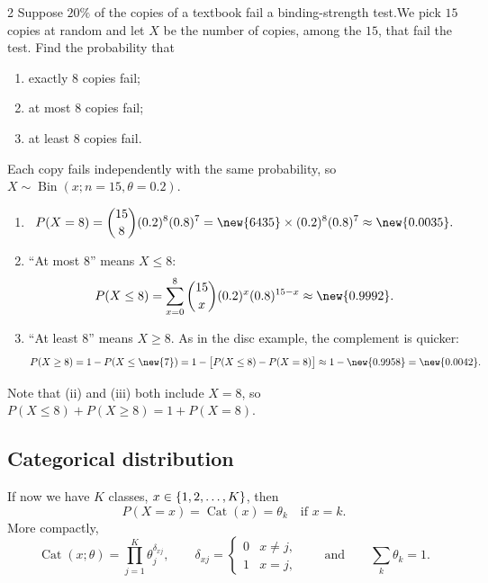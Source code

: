 \begin{homework}{2}
Suppose $20\%$ of the copies of a textbook fail a binding-strength test.\footnotemark We pick $15$ copies at random and let $X$ be the number of copies, among the $15$, that fail the test. Find the probability that
\begin{enumerate}[label=(\roman*)]
\item exactly $8$ copies fail;
\item at most $8$ copies fail;
\item at least $8$ copies fail.
\end{enumerate}

\soln
Each copy fails independently with the same probability, so $X \sim \operatorname{Bin}(x; n = 15, \theta = 0.2)$.
\begin{enumerate}[label=(\roman*)]
\item
\[
P(X = 8) = \binom{15}{8}(0.2)^{8}(0.8)^{7} = \new{6435}\times(0.2)^{8}(0.8)^{7} \approx \new{0.0035}.
\]
\item ``At most $8$'' means $X \le 8$:
\[
P(X \le 8) = \sum_{x=0}^{8}\binom{15}{x}(0.2)^{x}(0.8)^{15-x} \approx \new{0.9992}.
\]
\item ``At least $8$'' means $X \ge 8$. As in the disc example, the complement is quicker:
\[
P(X \ge 8) = 1 - P(X \le \new{7}) = 1 - \big[P(X \le 8) - P(X = 8)\big] \approx 1 - \new{0.9958} = \new{0.0042}.
\]
\end{enumerate}
Note that (ii) and (iii) both include $X = 8$, so $P(X \le 8) + P(X \ge 8) = 1 + P(X = 8)$.
\end{homework}

\subsection{Categorical distribution}
If now we have $K$ classes, $x \in \left\{1, 2, \dots, K\right\}$, then
\[
P(X = x) = \operatorname{Cat}(x) = \theta_k \quad \text{if } x = k.
\]
More compactly,
\[
\operatorname{Cat}(x; \theta) = \prod_{j=1}^{K} \theta_j^{\delta_{xj}},
\qquad
\delta_{xj} =
\begin{cases}
0 & x \neq j,\\
1 & x = j,
\end{cases}
\qquad\text{and}\qquad \sum_{k} \theta_k = 1.
\]


